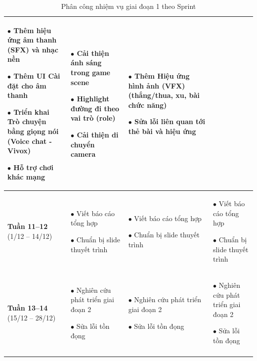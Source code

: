 \begin{longtable}{|p{2cm}|p{4cm}|p{4cm}|p{4cm}|}
    $\bullet$ Thêm hiệu ứng âm thanh (SFX) và nhạc nền
    
    $\bullet$ Thêm UI Cài đặt cho âm thanh
    
    $\bullet$ Triển khai Trò chuyện bằng giọng nói (Voice chat - Vivox)
    
    $\bullet$ Hỗ trợ chơi khác mạng
&
    $\bullet$ Cải thiện ánh sáng trong game scene
    
    $\bullet$ Highlight đường đi theo vai trò (role)
    
    $\bullet$ Cải thiện di chuyển camera
&
    $\bullet$ Thêm Hiệu ứng hình ảnh (VFX) (thắng/thua, xu, bài chức năng)
    
    $\bullet$ Sửa lỗi liên quan tới thẻ bài và hiệu ứng
\\
\hline

\textbf{Tuần 11--12} \newline (1/12 -- 14/12)
&
    $\bullet$ Viết báo cáo tổng hợp
    
    $\bullet$ Chuẩn bị slide thuyết trình
&
    $\bullet$ Viết báo cáo tổng hợp
    
    $\bullet$ Chuẩn bị slide thuyết trình
&
    $\bullet$ Viết báo cáo tổng hợp
    
    $\bullet$ Chuẩn bị slide thuyết trình
\\
\hline

\textbf{Tuần 13--14} \newline (15/12 -- 28/12)
&
    $\bullet$ Nghiên cứu phát triển giai đoạn 2

    $\bullet$ Sửa lỗi tồn đọng
&
    $\bullet$ Nghiên cứu phát triển giai đoạn 2

    $\bullet$ Sửa lỗi tồn đọng
&
    $\bullet$ Nghiên cứu phát triển giai đoạn 2

    $\bullet$ Sửa lỗi tồn đọng
\\
\hline
\caption{Phân công nhiệm vụ giai đoạn 1 theo Sprint}
\end{longtable}

